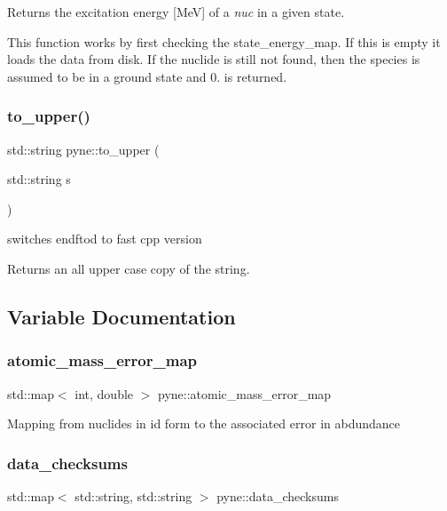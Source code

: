 Returns the excitation energy \mbox{[}MeV\mbox{]} of a {\itshape nuc} in a given state. 

This function works by first checking the state\+\_\+energy\+\_\+map. If this is empty it loads the data from disk. If the nuclide is still not found, then the species is assumed to be in a ground state and 0. is returned. \mbox{\label{namespacepyne_aa02f7d3ceda305d11379f2f778e4d645}} 
\subsubsection{\texorpdfstring{to\+\_\+upper()}{to\_upper()}}
{\footnotesize\ttfamily std\+::string pyne\+::to\+\_\+upper (\begin{DoxyParamCaption}\item[{std\+::string}]{s }\end{DoxyParamCaption})}



switches endftod to fast cpp version 

Returns an all upper case copy of the string. 

\subsection{Variable Documentation}
\mbox{\label{namespacepyne_a70711189f1078e2ebc132db9ce7ab0a7}} 
\subsubsection{\texorpdfstring{atomic\+\_\+mass\+\_\+error\+\_\+map}{atomic\_mass\_error\_map}}
{\footnotesize\ttfamily std\+::map$<$ int, double $>$ pyne\+::atomic\+\_\+mass\+\_\+error\+\_\+map}

Mapping from nuclides in id form to the associated error in abdundance \mbox{\label{namespacepyne_a092bde815498a51a7532e3021a63ede5}} 
\subsubsection{\texorpdfstring{data\+\_\+checksums}{data\_checksums}}
{\footnotesize\ttfamily std\+::map$<$ std\+::string, std\+::string $>$ pyne\+::data\+\_\+checksums}

